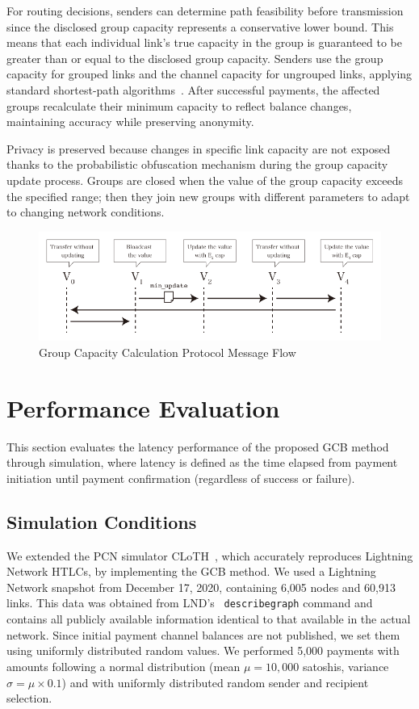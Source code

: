 \documentclass[a4paper]{IEEEtran}
\begin{document}
For routing decisions, senders can determine path feasibility before transmission since the disclosed group capacity represents a conservative lower bound.
This means that each individual link's true capacity in the group is guaranteed to be greater than or equal to the disclosed group capacity.
Senders use the group capacity for grouped links and the channel capacity for ungrouped links, applying standard shortest-path algorithms~\cite{lnd,eclair,clightning}.
After successful payments, the affected groups recalculate their minimum capacity to reflect balance changes, maintaining accuracy while preserving anonymity.

Privacy is preserved because changes in specific link capacity are not exposed thanks to the probabilistic obfuscation mechanism during the group capacity update process.
Groups are closed when the value of the group capacity exceeds the specified range; then they join new groups with different parameters to adapt to changing network conditions.

\begin{figure}[htbp]
	\centerline{\includegraphics[width=\linewidth]{fig/group_cap_handover}}
	\caption{Group Capacity Calculation Protocol Message Flow}
	\label{fig:group_cap_handover}
\end{figure}

\section{Performance Evaluation}

This section evaluates the latency performance of the proposed GCB method through simulation, where latency is defined as the time elapsed from payment initiation until payment confirmation (regardless of success or failure).

\subsection{Simulation Conditions}
We extended the PCN simulator CLoTH~\cite{CONOSCENTI2021100717}, which accurately reproduces Lightning Network HTLCs, by implementing the GCB method.
We used a Lightning Network snapshot from December 17, 2020, containing 6,005 nodes and 60,913 links.
This data was obtained from LND's~\cite{lnd} \texttt{describegraph} command and contains all publicly available information identical to that available in the actual network.
Since initial payment channel balances are not published, we set them using uniformly distributed random values.
We performed 5,000 payments with amounts following a normal distribution (mean $\mu = 10,000$ satoshis, variance $\sigma = \mu \times 0.1$) and with uniformly distributed random sender and recipient selection.
\end{document}
